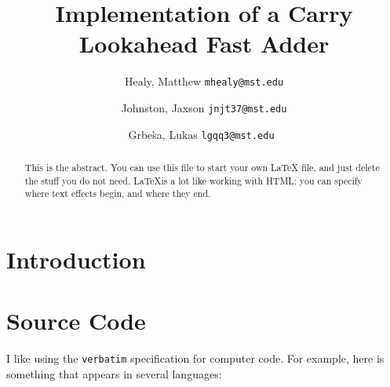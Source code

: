 \documentclass[journal]{IEEEtran}
\begin{document}
\title{Implementation of a Carry Lookahead Fast Adder}
\author{
	Healy, Matthew
	\texttt{mhealy@mst.edu}\\
	\and
	Johnston, Jaxson
	\texttt{jnjt37@mst.edu}\\
	\and
	Grbe\`sa, Lukas
	\texttt{lgqq3@mst.edu}\
}

\maketitle


\begin{abstract}
This is the abstract. You can use this file to start your own LaTeX file,
and just delete the stuff you do not need. \LaTeX  is a lot like working
with HTML: you can specify where text effects begin, and where they end.
\end{abstract}

\section{Introduction}\label{sec:intro}

\section{Source Code}\label{sec:code}

I like using the \verb"verbatim" specification for computer code.
For example, here is something that appears in several
languages:
\end{document}
